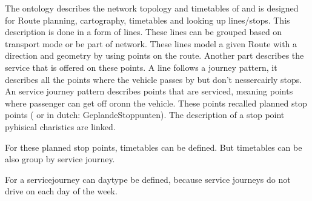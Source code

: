 The ontology describes the network topology and timetables of  and is designed for Route planning, cartography, timetables and looking up lines/stops. This description is done in a form of lines. These lines can be grouped based on transport mode or be part of network. These lines model a given Route with a direction and geometry by using points on the route. Another part describes the service that is offered on these points. A line follows a journey pattern, it describes all the points where the vehicle passes by but don't nessercairly stops. An service journey pattern describes points that are serviced, meaning points where passenger can get off oronn the vehicle. These points recalled planned stop points ( or in dutch: GeplandeStoppunten). The description of a stop point pyhisical charistics are linked. 

For these planned stop points, timetables can be defined. But timetables can be also group by service journey.

For a servicejourney can daytype be defined, because service journeys do not drive on each day of the week. 




